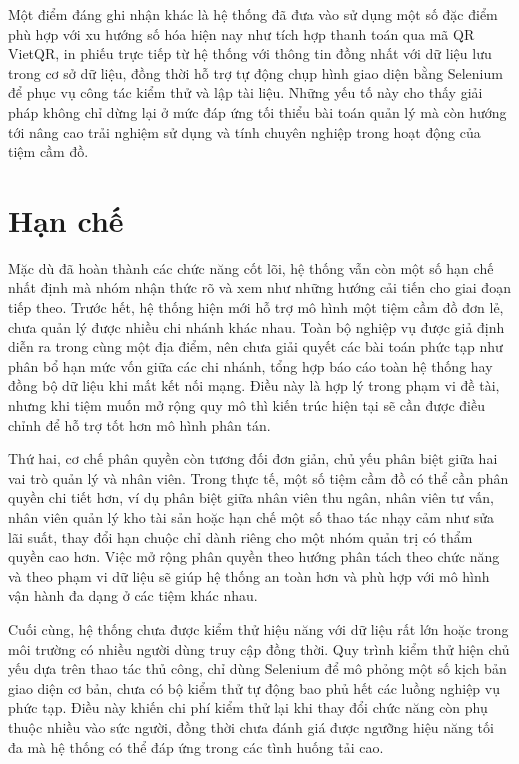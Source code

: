 \documentclass[13pt,a4paper]{extreport}
\begin{document}
Một điểm đáng ghi nhận khác là hệ thống đã đưa vào sử dụng một số đặc điểm phù hợp với xu hướng số hóa hiện nay như tích hợp thanh toán qua mã QR VietQR, in phiếu trực tiếp từ hệ thống với thông tin đồng nhất với dữ liệu lưu trong cơ sở dữ liệu, đồng thời hỗ trợ tự động chụp hình giao diện bằng Selenium để phục vụ công tác kiểm thử và lập tài liệu. Những yếu tố này cho thấy giải pháp không chỉ dừng lại ở mức đáp ứng tối thiểu bài toán quản lý mà còn hướng tới nâng cao trải nghiệm sử dụng và tính chuyên nghiệp trong hoạt động của tiệm cầm đồ.

\section{Hạn chế}

Mặc dù đã hoàn thành các chức năng cốt lõi, hệ thống vẫn còn một số hạn chế nhất định mà nhóm nhận thức rõ và xem như những hướng cải tiến cho giai đoạn tiếp theo. Trước hết, hệ thống hiện mới hỗ trợ mô hình một tiệm cầm đồ đơn lẻ, chưa quản lý được nhiều chi nhánh khác nhau. Toàn bộ nghiệp vụ được giả định diễn ra trong cùng một địa điểm, nên chưa giải quyết các bài toán phức tạp như phân bổ hạn mức vốn giữa các chi nhánh, tổng hợp báo cáo toàn hệ thống hay đồng bộ dữ liệu khi mất kết nối mạng. Điều này là hợp lý trong phạm vi đề tài, nhưng khi tiệm muốn mở rộng quy mô thì kiến trúc hiện tại sẽ cần được điều chỉnh để hỗ trợ tốt hơn mô hình phân tán.

Thứ hai, cơ chế phân quyền còn tương đối đơn giản, chủ yếu phân biệt giữa hai vai trò quản lý và nhân viên. Trong thực tế, một số tiệm cầm đồ có thể cần phân quyền chi tiết hơn, ví dụ phân biệt giữa nhân viên thu ngân, nhân viên tư vấn, nhân viên quản lý kho tài sản hoặc hạn chế một số thao tác nhạy cảm như sửa lãi suất, thay đổi hạn chuộc chỉ dành riêng cho một nhóm quản trị có thẩm quyền cao hơn. Việc mở rộng phân quyền theo hướng phân tách theo chức năng và theo phạm vi dữ liệu sẽ giúp hệ thống an toàn hơn và phù hợp với mô hình vận hành đa dạng ở các tiệm khác nhau.

Cuối cùng, hệ thống chưa được kiểm thử hiệu năng với dữ liệu rất lớn hoặc trong môi trường có nhiều người dùng truy cập đồng thời. Quy trình kiểm thử hiện chủ yếu dựa trên thao tác thủ công, chỉ dùng Selenium để mô phỏng một số kịch bản giao diện cơ bản, chưa có bộ kiểm thử tự động bao phủ hết các luồng nghiệp vụ phức tạp. Điều này khiến chi phí kiểm thử lại khi thay đổi chức năng còn phụ thuộc nhiều vào sức người, đồng thời chưa đánh giá được ngưỡng hiệu năng tối đa mà hệ thống có thể đáp ứng trong các tình huống tải cao.
\end{document}
